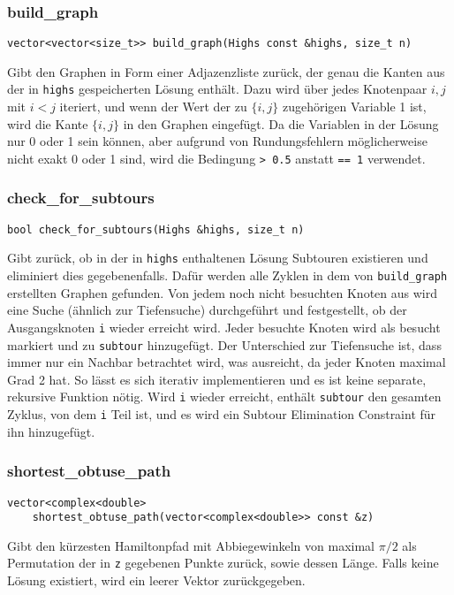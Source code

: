 \documentclass[a4paper, 10pt, ngerman]{article}
\begin{document}
\subsubsection{build\_graph}
\verb|vector<vector<size_t>> build_graph(Highs const &highs, size_t n)|
\medskip

\noindent Gibt den Graphen in Form einer Adjazenzliste zurück, der genau die Kanten aus der in \verb|highs| gespeicherten Lösung enthält. Dazu wird über jedes Knotenpaar $i, j$ mit $i < j$ iteriert, und wenn der Wert der zu $\{i, j\}$ zugehörigen Variable 1 ist, wird die Kante $\{i, j\}$ in den Graphen eingefügt. Da die Variablen in der Lösung nur 0 oder 1 sein können, aber aufgrund von Rundungsfehlern möglicherweise nicht exakt 0 oder 1 sind, wird die Bedingung \verb|> 0.5| anstatt \verb|== 1| verwendet.

\subsubsection{check\_for\_subtours}
\verb|bool check_for_subtours(Highs &highs, size_t n)|
\medskip

\noindent Gibt zurück, ob in der in \verb|highs| enthaltenen Lösung Subtouren existieren und eliminiert dies gegebenenfalls. Dafür werden alle Zyklen in dem von \verb|build_graph| erstellten Graphen gefunden. Von jedem noch nicht besuchten Knoten aus wird eine Suche (ähnlich zur Tiefensuche) durchgeführt und festgestellt, ob der Ausgangsknoten \verb|i| wieder erreicht wird. Jeder besuchte Knoten wird als besucht markiert und zu \verb|subtour| hinzugefügt. Der Unterschied zur Tiefensuche ist, dass immer nur ein Nachbar betrachtet wird, was ausreicht, da jeder Knoten maximal Grad 2 hat. So lässt es sich iterativ implementieren und es ist keine separate, rekursive Funktion nötig. Wird \verb|i| wieder erreicht, enthält \verb|subtour| den gesamten Zyklus, von dem \verb|i| Teil ist, und es wird ein Subtour Elimination Constraint für ihn hinzugefügt.

\subsubsection{shortest\_obtuse\_path}

\verb|vector<complex<double>| \\
\verb|    shortest_obtuse_path(vector<complex<double>> const &z)|
\medskip

\noindent Gibt den kürzesten Hamiltonpfad mit Abbiegewinkeln von maximal $\pi / 2$ als Permutation der in \verb|z| gegebenen Punkte zurück, sowie dessen Länge. Falls keine Lösung existiert, wird ein leerer Vektor zurückgegeben.
\end{document}

